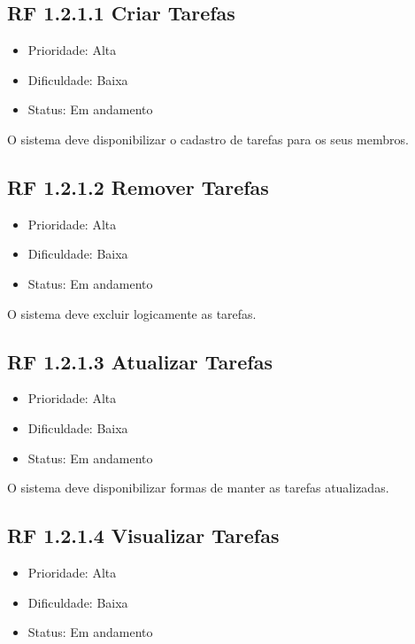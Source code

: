\subsection{RF 1.2.1.1 Criar Tarefas}

\begin{itemize}
  \item{Prioridade: Alta}
  \item{Dificuldade: Baixa}
  \item{Status: Em andamento}
\end{itemize}

O sistema deve disponibilizar o cadastro de tarefas para os seus membros.


\subsection{RF 1.2.1.2 Remover Tarefas}

\begin{itemize}
  \item{Prioridade: Alta}
  \item{Dificuldade: Baixa}
  \item{Status: Em andamento}
\end{itemize}

O sistema deve excluir logicamente as tarefas.


\subsection{RF 1.2.1.3 Atualizar Tarefas}

\begin{itemize}
  \item{Prioridade: Alta}
  \item{Dificuldade: Baixa}
  \item{Status: Em andamento}
\end{itemize}

O sistema deve disponibilizar formas de manter as tarefas atualizadas.


\subsection{RF 1.2.1.4 Visualizar Tarefas}

\begin{itemize}
  \item{Prioridade: Alta}
  \item{Dificuldade: Baixa}
  \item{Status: Em andamento}
\end{itemize}

